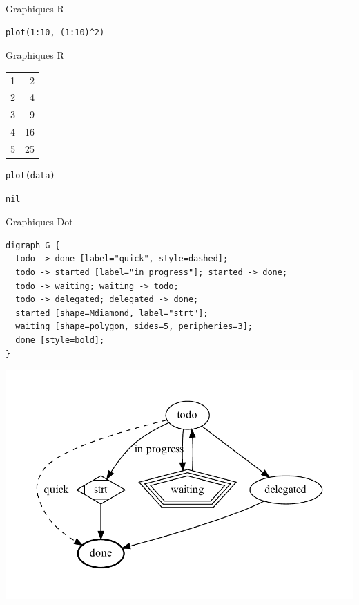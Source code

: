 \documentclass[presentation,t,hideothersubsections]{beamer}
\begin{document}
\begin{frame}[fragile,label=sec-3-5-1]{Graphiques R}
 \lstset{language=R,numbers=none}
\begin{lstlisting}
plot(1:10, (1:10)^2)
\end{lstlisting}
\end{frame}
\begin{frame}[fragile,label=sec-3-5-2]{Graphiques R}
 \begin{center}
\begin{tabular}{rr}
1 & 2\\
2 & 4\\
3 & 9\\
4 & 16\\
5 & 25\\
\end{tabular}
\end{center}

\lstset{language=R,label=R-plot,numbers=none}
\begin{lstlisting}
plot(data)
\end{lstlisting}

\begin{verbatim}
nil
\end{verbatim}
\end{frame}
\begin{frame}[fragile,label=sec-3-5-3]{Graphiques Dot}

 \lstset{language=dot,numbers=none}
\begin{lstlisting}
digraph G {
  todo -> done [label="quick", style=dashed];
  todo -> started [label="in progress"]; started -> done;
  todo -> waiting; waiting -> todo;
  todo -> delegated; delegated -> done;
  started [shape=Mdiamond, label="strt"];
  waiting [shape=polygon, sides=5, peripheries=3];
  done [style=bold];
}
\end{lstlisting}

\includegraphics[width=.9\linewidth]{foo.pdf}
\end{frame}
\end{document}
